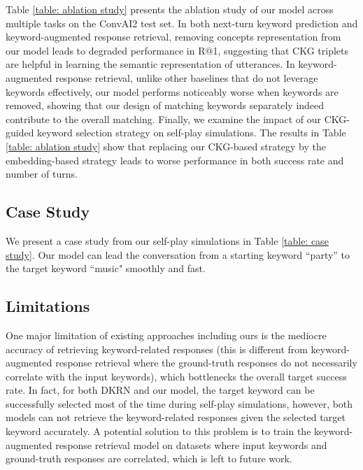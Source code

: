 \documentclass[letterpaper]{article} %
\begin{document}
Table \ref{table: ablation study} presents the ablation study of our model across multiple tasks on the ConvAI2 test set. In both next-turn keyword prediction and keyword-augmented response retrieval, removing concepts representation from our model leads to degraded performance in R@1, suggesting that CKG triplets are helpful in learning the semantic representation of utterances. In keyword-augmented response retrieval, unlike other baselines that do not leverage keywords effectively, our model performs noticeably worse when keywords are removed, showing that our design of matching keywords separately indeed contribute to the overall matching. Finally, we examine the impact of our CKG-guided keyword selection strategy on self-play simulations. The results in Table \ref{table: ablation study} show that replacing our CKG-based strategy by the embedding-based strategy \cite{tang2019target, qin2020dynamic} leads to worse performance in both success rate and number of turns.

\subsection{Case Study}
\label{sec: case study}
We present a case study from our self-play simulations in Table \ref{table: case study}. Our model can lead the conversation from a starting keyword ``party'' to the target keyword ``music" smoothly and fast.

\subsection{Limitations}
\label{sec: limitations}
One major limitation of existing approaches including ours is the mediocre accuracy of retrieving keyword-related responses (this is different from keyword-augmented response retrieval where the ground-truth responses do not necessarily correlate with the input keywords), which bottlenecks the overall target success rate. In fact, for both DKRN and our model, the target keyword can be successfully selected most of the time during self-play simulations, however, both models can not retrieve the keyword-related responses given the selected target keyword accurately. A potential solution to this problem is to train the keyword-augmented response retrieval model on datasets where input keywords and ground-truth responses are correlated, which is left to future work.

\vspace{-1.62mm}
\end{document}
